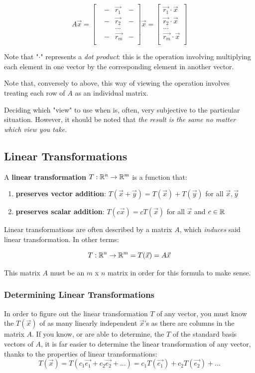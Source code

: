 \documentclass[12pt]{article}
\begin{document}
\[
A\Vec{x} = \begin{bmatrix}
&- & \Vec{r_1} &-\\
&- & \Vec{r_2} &-\\
& & ... &\\
&- & \Vec{r_m} &-\\
\end{bmatrix}\Vec{x}=\begin{bmatrix}
\Vec{r_1} \cdot \Vec{x}\\
\Vec{r_2} \cdot \Vec{x}\\
...\\
\Vec{r_m} \cdot \Vec{x}\\
\end{bmatrix}
\]

Note that "$\cdot$" represents a \textit{dot product}: this is the operation involving multiplying each element in one vector by the corresponding element in another vector.

Note that, conversely to above, this way of viewing the operation involves treating each row of $A$ as an individual matrix.

Deciding which "view" to use when is, often, very subjective to the particular situation. However, it should be noted that \textit{the result is the same no matter which view you take.}

\subsection{Linear Transformations}
A \textbf{linear transformation} $T: \mathbb{R}^n \to \mathbb{R}^m$ is a function that:
\begin{enumerate}
    \item \textbf{preserves vector addition}: $T(\Vec{x}+\Vec{y}) = T(\Vec{x}) + T(\Vec{y})$ for all $\Vec{x}, \Vec{y}$
    \item \textbf{preserves scalar addition}: $T(c \Vec{x}) = c T(\Vec{x})$ for all $\Vec{x}$ and $c \in \mathbb{R}$
\end{enumerate}

Linear transformations are often described by a matrix $A$, which \textit{induces} said linear transformation. In other terms:

\[
T: \mathbb{R}^n \to \mathbb{R}^m = T(\Vec{x}) = A\Vec{x}
\]

This matrix $A$ must be an $m$ x $n$ matrix in order for this formula to make sense.

\subsubsection{Determining Linear Transformations}
In order to figure out the linear transformation $T$ of any vector, you must know the $T(\Vec{x})$ of as many linearly independent $\Vec{x}$'s as there are columns in the matrix $A$. If you know, or are able to determine, the $T$ of the standard basis vectors of $A$, it is far easier to determine the linear transformation of any vector, thanks to the properties of linear transformations:
\[
T(\Vec{x}) = T(c_1 \Vec{e_1} + c_2 \Vec{e_2} + ...) = c_1 T(\Vec{e_1}) + c_2 T(\Vec{e_2}) + ...
\]
\end{document}
